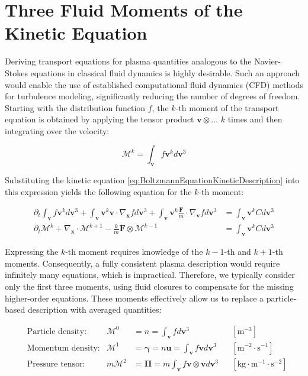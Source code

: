 \section{Three Fluid Moments of the Kinetic Equation}
\label{sec:desc_fluidMoments}
Deriving transport equations for plasma quantities analogous to the Navier-Stokes equations in classical fluid dynamics is highly desirable. Such an approach would enable the use of established computational fluid dynamics (CFD) methods for turbulence modeling, significantly reducing the number of degrees of freedom. Starting with the distribution function $f$, the $k$-th moment of the transport equation is obtained by applying the tensor product $\mathbf{v} \otimes \dots$ $k$ times and then integrating over the velocity:

\begin{equation}
	\mathcal{M}^k = \int_\mathbf{v} f\mathbf{v}^k d\mathbf{v}^3
\end{equation}

Substituting the kinetic equation \ref{eq:BoltzmannEquationKineticDescription} into this expression yields the following equation for the $k$-th moment:

\begin{align}
	\partial_t \int_\mathbf{v} f\mathbf{v}^k d\mathbf{v}^3 + \int_\mathbf{v} \mathbf{v}^k \mathbf{v} \cdot \nabla_{\mathbf{x}} f d\mathbf{v}^3 + \int_\mathbf{v} \mathbf{v}^k \frac{\mathbf{F}}{m} \cdot \nabla_{\mathbf{v}} f d\mathbf{v}^3 &= \int_\mathbf{v} \mathbf{v}^k C d\mathbf{v}^3 \nonumber \\
	\partial_t \mathcal{M}^k + \nabla_{\mathbf{x}} \cdot \mathcal{M}^{k+1} - \frac{k}{m} \mathbf{F} \otimes \mathcal{M}^{k-1} &= \int_\mathbf{v} \mathbf{v}^k C d\mathbf{v}^3 \label{eq:desc_generalMomentsEq}
\end{align}

Expressing the $k$-th moment requires knowledge of the $k-1$-th and $k+1$-th moments. Consequently, a fully consistent plasma description would require infinitely many equations, which is impractical. Therefore, we typically consider only the first three moments, using fluid closures to compensate for the missing higher-order equations. These moments effectively allow us to replace a particle-based description with averaged quantities:

\begin{align}
	&\text{Particle density:} & \mathcal{M}^0 &= n = \int_\mathbf{v} f d\mathbf{v}^3 && \left[\text{m}^{-3}\right] \\
	&\text{Momentum density:} & \mathcal{M}^1 &= \boldsymbol{\gamma}  = n \mathbf{u} = \int_\mathbf{v} f \mathbf{v} d\mathbf{v}^3 && \left[\text{m}^{-2} \cdot \text{s}^{-1}\right] \\
	&\text{Pressure tensor:}   &  m \mathcal{M}^2 &= \boldsymbol{\Pi} = m \int_\mathbf{v} f \mathbf{v} \otimes \mathbf{v} d\mathbf{v}^3 && \left[\text{kg} \cdot \text{m}^{-1} \cdot \text{s}^{-2}\right]
\end{align}

